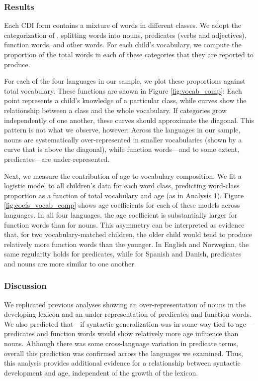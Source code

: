 \documentclass[10pt,letterpaper]{article}
\begin{document}
\subsubsection{Results}

Each CDI form contains a mixture of words in different classes. We adopt the categorization of , splitting words into nouns, predicates (verbs and adjectives), function words, and other words. For each child's vocabulary, we compute the proportion of the total words in each of these categories that they are reported to produce.

For each of the four languages in our sample, we plot these proportions against total vocabulary. These functions are shown in Figure \ref{fig:vocab_comp}: Each point represents a child's knowledge of a particular class, while curves show the relationship between a class and the whole vocabulary. If categories grow independently of one another, these curves should approximate the diagonal. This pattern is not what we observe, however: Across the languages in our sample, nouns are systematically over-represented in smaller vocabularies (shown by a curve that is above the diagonal), while function words---and to some extent, predicates---are under-represented. 

Next, we measure the contribution of age to vocabulary composition. We fit a logistic model to all children's data for each word class, predicting word-class proportion as a function of total vocabulary and age (as in Analysis 1). Figure \ref{fig:coefs_vocab_comp} shows age coefficients for each of these models across languages. In all four languages, the age coefficient is substantially larger for function words than for nouns. This asymmetry can be interpreted as evidence that, for two vocabulary-matched children, the older child would tend to produce relatively more function words than the younger. In English and Norwegian, the same regularity holds for predicates, while for Spanish and Danish, predicates and nouns are more similar to one another.

\subsubsection{Discussion}

We replicated previous analyses \cite{bates1994} showing an over-representation of nouns in the developing lexicon and an under-representation of predicates and function words. We also predicted that---if syntactic generalization was in some way tied to age---predicates and function words would show relatively more age influence than nouns. Although there was some cross-language variation in predicate terms, overall this prediction was confirmed across the languages we examined. Thus, this analysis provides additional evidence for a relationship between syntactic development and age, independent of the growth of the lexicon.
\end{document}
